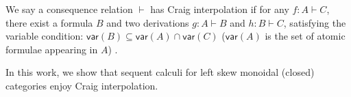 \documentclass[a4paper,UKenglish,cleveref, autoref, thm-restate, anonymous]{lipics-v2021}
\newcommand{\GG}{\Gamma}
\newcommand{\GT}{\Theta}
\newcommand{\vd}{\vdash}
\newcommand{\LSkG}{$\mathtt{LSkG}$}
\newcommand{\LSkT}{$\mathtt{LSkT}$}
\newcommand{\vars}[1]{\mathsf{var}(#1)}
\begin{document}
We say a consequence relation $\vdash$ has Craig interpolation if for any $f: A \vdash C$, there exist a formula $B$ and two derivations $g: A \vdash B$ and $h: B \vdash C$, satisfying the variable condition: $\vars{B} \subseteq \vars{A} \cap \vars{C}$ ($\vars{A}$ is the set of atomic formulae appearing in $A$) \cite{craig:interpolation:1957}.

In this work, we show that sequent calculi for left skew monoidal (closed) categories enjoy Craig interpolation.



\end{document}
